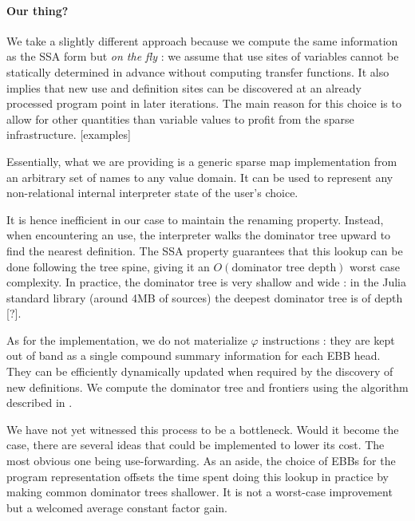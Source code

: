 \documentclass[11pt]{article}
\renewcommand{\phi}{\varphi}
\begin{document}
\paragraph{Our thing?} We take a slightly different approach because we compute the same information as the SSA form but \emph{on the fly} : we assume that use sites of variables cannot be statically determined in advance without computing transfer functions.
It also implies that new use and definition sites can be discovered at an already processed program point in later iterations.
The main reason for this choice is to allow for other quantities than variable values to profit from the sparse infrastructure.
[examples]

Essentially, what we are providing is a generic sparse map implementation from an arbitrary set of names to any value domain.
It can be used to represent any non-relational internal interpreter state of the user's choice.

It is hence inefficient in our case to maintain the renaming property. Instead, when encountering an use, the interpreter walks the dominator tree upward to find the nearest definition.
The SSA property guarantees that this lookup can be done following the tree spine, giving it an $O(\text{dominator tree depth})$ worst case complexity. In practice, the dominator tree is very shallow and wide : in the Julia standard library (around 4MB of sources) the deepest dominator tree is of depth [?].

As for the implementation, we do not materialize $\phi$ instructions : they are kept out of band as a single compound summary information for each EBB head.
They can be efficiently dynamically updated when required by the discovery of new definitions.
We compute the dominator tree and frontiers using the algorithm described in \cite{domtree}.

We have not yet witnessed this process to be a bottleneck. Would it become the case, there are several ideas that could be implemented to lower its cost. The most obvious one being use-forwarding.
As an aside, the choice of EBBs for the program representation offsets the time spent doing this lookup in practice by making common dominator trees shallower.
It is not a worst-case improvement but a welcomed average constant factor gain.

\end{document}
